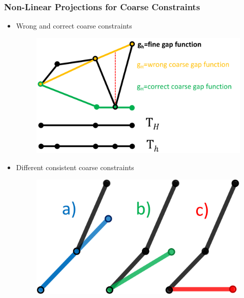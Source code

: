 \documentclass[8pt, oneside]{beamer}   	%
\newcommand{\colg}{\color{mygreen}}
\newcommand{\coly}{\color{yellow}}
\newcommand{\titlecolor}[1]{\frametitle{\textcolor{dkgrey}{ \textbf{#1}}}}
\begin{document}
\begin{frame}
\titlecolor{Non-Linear Projections for Coarse Constraints}
\begin{itemize}
\item {\coly Wrong} and {\colg correct} coarse constraints
\begin{figure}[htbp!]
		\includegraphics[scale=0.15]{img/coarseconstraintrepresentation.pdf}
\end{figure}
\item Different consistent coarse constraints
\begin{figure}[htbp!]
		\includegraphics[scale=0.11]{img/coarseconstraintabc.pdf}
\end{figure}
\end{itemize}
\end{frame}
\end{document}
